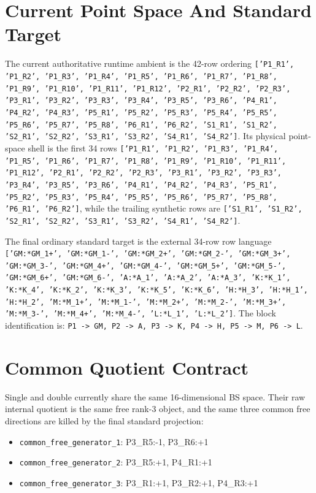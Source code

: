 \documentclass[11pt]{article}
\begin{document}
\section{Current Point Space And Standard Target}
The current authoritative runtime ambient is the 42-row ordering
\texttt{['P1\_R1', 'P1\_R2', 'P1\_R3', 'P1\_R4', 'P1\_R5', 'P1\_R6', 'P1\_R7', 'P1\_R8', 'P1\_R9', 'P1\_R10', 'P1\_R11', 'P1\_R12', 'P2\_R1', 'P2\_R2', 'P2\_R3', 'P3\_R1', 'P3\_R2', 'P3\_R3', 'P3\_R4', 'P3\_R5', 'P3\_R6', 'P4\_R1', 'P4\_R2', 'P4\_R3', 'P5\_R1', 'P5\_R2', 'P5\_R3', 'P5\_R4', 'P5\_R5', 'P5\_R6', 'P5\_R7', 'P5\_R8', 'P6\_R1', 'P6\_R2', 'S1\_R1', 'S1\_R2', 'S2\_R1', 'S2\_R2', 'S3\_R1', 'S3\_R2', 'S4\_R1', 'S4\_R2']}.
Its physical point-space shell is the first 34 rows
\texttt{['P1\_R1', 'P1\_R2', 'P1\_R3', 'P1\_R4', 'P1\_R5', 'P1\_R6', 'P1\_R7', 'P1\_R8', 'P1\_R9', 'P1\_R10', 'P1\_R11', 'P1\_R12', 'P2\_R1', 'P2\_R2', 'P2\_R3', 'P3\_R1', 'P3\_R2', 'P3\_R3', 'P3\_R4', 'P3\_R5', 'P3\_R6', 'P4\_R1', 'P4\_R2', 'P4\_R3', 'P5\_R1', 'P5\_R2', 'P5\_R3', 'P5\_R4', 'P5\_R5', 'P5\_R6', 'P5\_R7', 'P5\_R8', 'P6\_R1', 'P6\_R2']},
while the trailing synthetic rows are
\texttt{['S1\_R1', 'S1\_R2', 'S2\_R1', 'S2\_R2', 'S3\_R1', 'S3\_R2', 'S4\_R1', 'S4\_R2']}.

The final ordinary standard target is the external 34-row row language
\texttt{['GM:*GM\_1+', 'GM:*GM\_1-', 'GM:*GM\_2+', 'GM:*GM\_2-', 'GM:*GM\_3+', 'GM:*GM\_3-', 'GM:*GM\_4+', 'GM:*GM\_4-', 'GM:*GM\_5+', 'GM:*GM\_5-', 'GM:*GM\_6+', 'GM:*GM\_6-', 'A:*A\_1', 'A:*A\_2', 'A:*A\_3', 'K:*K\_1', 'K:*K\_4', 'K:*K\_2', 'K:*K\_3', 'K:*K\_5', 'K:*K\_6', 'H:*H\_3', 'H:*H\_1', 'H:*H\_2', 'M:*M\_1+', 'M:*M\_1-', 'M:*M\_2+', 'M:*M\_2-', 'M:*M\_3+', 'M:*M\_3-', 'M:*M\_4+', 'M:*M\_4-', 'L:*L\_1', 'L:*L\_2']}.
The block identification is:
\texttt{P1 -> GM, P2 -> A, P3 -> K, P4 -> H, P5 -> M, P6 -> L}.

\section{Common Quotient Contract}
Single and double currently share the same 16-dimensional BS space. Their raw internal quotient is the same free rank-3 object, and the same three common free directions are killed by the final standard projection:
\begin{itemize}
\item \texttt{common\_free\_generator\_1}: P3\_R5:-1, P3\_R6:+1
\item \texttt{common\_free\_generator\_2}: P3\_R5:+1, P4\_R1:+1
\item \texttt{common\_free\_generator\_3}: P3\_R1:+1, P3\_R2:+1, P4\_R3:+1
\end{itemize}
\end{document}
